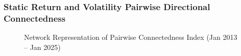 \documentclass[preprint, 3p,
authoryear]{elsarticle} %
\begin{document}
\begin{landscape}
\subsubsection{Static Return and Volatility Pairwise Directional Connectedness}

\begin{figure}[!ht]
  \caption{Network Representation of Pairwise Connectedness Index (Jan 2013 – Jan 2025)}
  \begin{minipage}{.8\textwidth}
  \end{minipage}
  \hfill
  \begin{minipage}{.8\textwidth}
  \end{minipage}
\end{figure}




\end{landscape}
\end{document}
